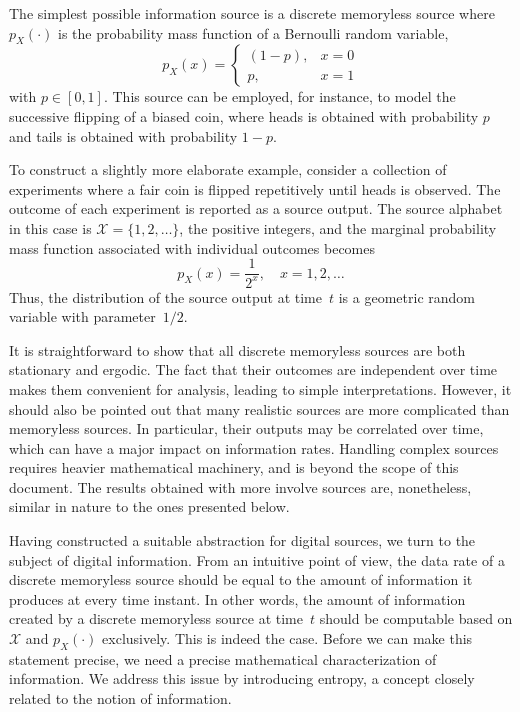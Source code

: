 \begin{example} \label{example:BinarySource}
The simplest possible information source is a discrete memoryless source where $p_X(\cdot)$ is the probability mass function of a Bernoulli random variable,
\begin{equation*}
p_X(x) = \begin{cases} (1 - p), & x = 0 \\
p, & x = 1 \end{cases}
\end{equation*}
with $p \in [0,1]$.
This source can be employed, for instance, to model the successive flipping of a biased coin, where heads is obtained with probability $p$ and tails is obtained with probability $1 - p$.
\end{example}

\begin{example}
To construct a slightly more elaborate example, consider a collection of experiments where a fair coin is flipped repetitively until heads is observed.
The outcome of each experiment is reported as a source output.
The source alphabet in this case is $\mathcal{X} = \{1, 2, \ldots \}$, the positive integers, and the marginal probability mass function associated with individual outcomes becomes
\begin{equation*}
p_X (x) = \frac{1}{2^x}, \quad x = 1, 2, \ldots
\end{equation*}
Thus, the distribution of the source output at time~$t$ is a geometric random variable with parameter~$1/2$.
\end{example}

It is straightforward to show that all discrete memoryless sources are both stationary and ergodic.
The fact that their outcomes are independent over time makes them convenient for analysis, leading to simple interpretations.
However, it should also be pointed out that many realistic sources are more complicated than memoryless sources.
In particular, their outputs may be correlated over time, which can have a major impact on information rates.
Handling complex sources requires heavier mathematical machinery, and is beyond the scope of this document.
The results obtained with more involve sources are, nonetheless, similar in nature to the ones presented below.

Having constructed a suitable abstraction for digital sources, we turn to the subject of digital information.
From an intuitive point of view, the data rate of a discrete memoryless source should be equal to the amount of information it produces at every time instant.
In other words, the amount of information created by a discrete memoryless source at time~$t$ should be computable based on $\mathcal{X}$ and $p_X(\cdot)$ exclusively.
This is indeed the case.
Before we can make this statement precise, we need a precise mathematical characterization of information.
We address this issue by introducing entropy, a concept closely related to the notion of information.


